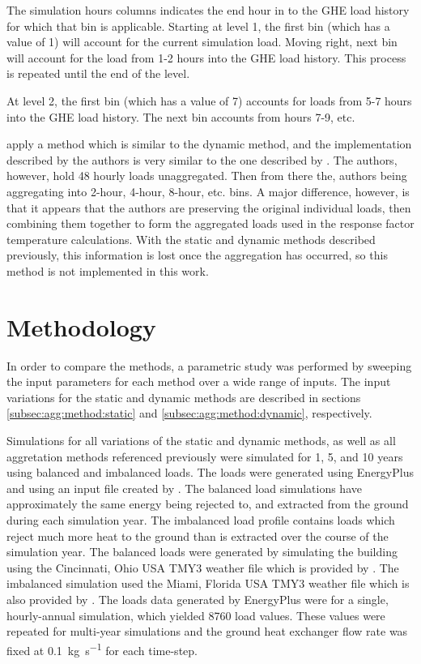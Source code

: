 \documentclass[review,12pt]{elsarticle}
\begin{document}
The simulation hours columns indicates the end hour in to the GHE load history for which that bin is applicable. Starting at level 1, the first bin (which has a value of 1) will account for the current simulation load. Moving right, next bin will account for the load from 1-2 hours into the GHE load history. This process is repeated until the end of the level.

At level 2, the first bin (which has a value of 7) accounts for loads from 5-7 hours into the GHE load history. The next bin accounts from hours 7-9, etc.

\cite{MARCOTTE2008651} apply a method which is similar to the dynamic method, and the implementation described by the authors is very similar to the one described by \cite{ClaessonJaved2012}. The authors, however, hold 48 hourly loads unaggregated. Then from there the, authors being aggregating into 2-hour, 4-hour, 8-hour, etc. bins. A major difference, however, is that it appears that the authors are preserving the original individual loads, then combining them together to form the aggregated loads used in the response factor temperature calculations. With the static and dynamic methods described previously, this information is lost once the aggregation has occurred, so this method is not implemented in this work.

\section{Methodology}

In order to compare the methods, a parametric study was performed by sweeping the input parameters for each method over a wide range of inputs. The input variations for the static and dynamic methods are described in sections \ref{subsec:agg:method:static} and \ref{subsec:agg:method:dynamic}, respectively.

Simulations for all variations of the static and dynamic methods, as well as all aggretation methods referenced previously were simulated for 1, 5, and 10 years using balanced and imbalanced loads. The loads were generated using EnergyPlus \citep{CRAWLEY2001319} and using an input file created by \cite{Deru2011}. The balanced load simulations have approximately the same energy being rejected to, and extracted from the ground during each simulation year. The imbalanced load profile contains loads which reject much more heat to the ground than is extracted over the course of the simulation year. The balanced loads were generated by simulating the building using the Cincinnati, Ohio USA TMY3 weather file which is provided by \cite{DOEWeatherData}. The imbalanced simulation used the Miami, Florida USA TMY3 weather file which is also provided by \cite{DOEWeatherData}. The loads data generated by EnergyPlus were for a single, hourly-annual simulation, which yielded 8760 load values. These values were repeated for multi-year simulations and the ground heat exchanger flow rate was fixed at \SI{0.1}{\kilogram\per\second} for each time-step.
\end{document}
